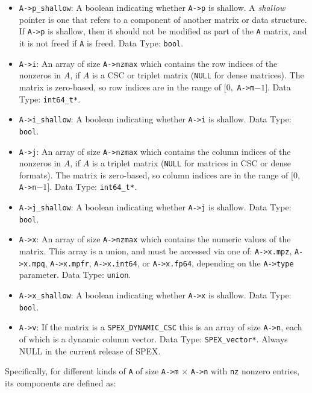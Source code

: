 \documentclass[12pt,oneside]{book}
\theoremstyle{definition}
\begin{document}
\begin{itemize}
    \item \verb|A->p_shallow|: A boolean indicating whether \verb|A->p| is shallow. A {\em shallow} pointer is one that refers to a component of another matrix or data structure.  If \verb|A->p| is shallow, then it should not be modified as part of the \verb|A| matrix, and it is not freed if \verb|A| is freed. Data Type: \verb|bool|.

    \item \verb|A->i|: An array of size \verb|A->nzmax| which contains the row indices of the nonzeros in $A$, if $A$ is a CSC or triplet matrix (\verb|NULL| for dense matrices). The matrix is zero-based, so row indices are in the range of $[0,$ \verb|A->m|$-1]$. Data Type: \verb|int64_t*|.

    \item \verb|A->i_shallow|: A boolean indicating whether \verb|A->i| is shallow. Data Type: \verb|bool|.

    \item \verb|A->j|: An array of size \verb|A->nzmax| which contains the column indices of the nonzeros in $A$, if $A$ is a triplet matrix (\verb|NULL| for matrices in CSC or dense formats). The matrix is zero-based, so column indices are in the range of $[0,$ \verb|A->n|$-1]$. Data Type: \verb|int64_t*|.

    \item \verb|A->j_shallow|: A boolean indicating whether \verb|A->j| is shallow. Data Type: \verb|bool|.

    \item \verb|A->x|: An array of size \verb|A->nzmax| which contains the numeric values of the matrix.  This array is a union, and must be accessed via one of: \verb|A->x.mpz|, \verb|A->x.mpq|, \verb|A->x.mpfr|, \verb|A->x.int64|, or \verb|A->x.fp64|, depending on the \verb|A->type| parameter. Data Type: \verb|union|.

    \item \verb|A->x_shallow|: A boolean indicating whether \verb|A->x| is shallow. Data Type: \verb|bool|.

    \item \verb|A->v|: If the matrix is a \verb|SPEX_DYNAMIC_CSC| this is an array of size \verb|A->n|, each of which is a dynamic column vector. Data Type: \verb|SPEX_vector*|. Always NULL in the current release of SPEX.
\end{itemize}

Specifically, for different kinds of \verb|A| of size \verb|A->m| $\times$ \verb|A->n|
with \verb|nz| nonzero entries, its components are defined as:
\end{document}
